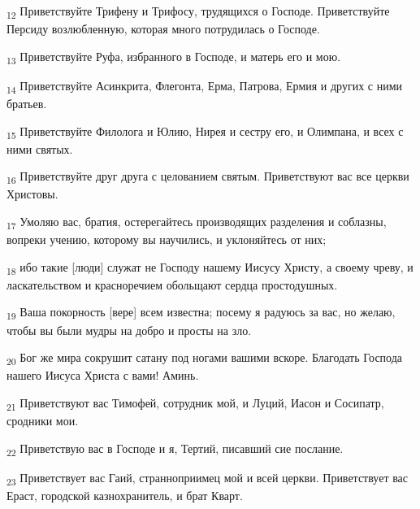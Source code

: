 \begin{tcolorbox}
\textsubscript{12} Приветствуйте Трифену и Трифосу, трудящихся о Господе. Приветствуйте Персиду возлюбленную, которая много потрудилась о Господе.
\end{tcolorbox}
\begin{tcolorbox}
\textsubscript{13} Приветствуйте Руфа, избранного в Господе, и матерь его и мою.
\end{tcolorbox}
\begin{tcolorbox}
\textsubscript{14} Приветствуйте Асинкрита, Флегонта, Ерма, Патрова, Ермия и других с ними братьев.
\end{tcolorbox}
\begin{tcolorbox}
\textsubscript{15} Приветствуйте Филолога и Юлию, Нирея и сестру его, и Олимпана, и всех с ними святых.
\end{tcolorbox}
\begin{tcolorbox}
\textsubscript{16} Приветствуйте друг друга с целованием святым. Приветствуют вас все церкви Христовы.
\end{tcolorbox}
\begin{tcolorbox}
\textsubscript{17} Умоляю вас, братия, остерегайтесь производящих разделения и соблазны, вопреки учению, которому вы научились, и уклоняйтесь от них;
\end{tcolorbox}
\begin{tcolorbox}
\textsubscript{18} ибо такие [люди] служат не Господу нашему Иисусу Христу, а своему чреву, и ласкательством и красноречием обольщают сердца простодушных.
\end{tcolorbox}
\begin{tcolorbox}
\textsubscript{19} Ваша покорность [вере] всем известна; посему я радуюсь за вас, но желаю, чтобы вы были мудры на добро и просты на зло.
\end{tcolorbox}
\begin{tcolorbox}
\textsubscript{20} Бог же мира сокрушит сатану под ногами вашими вскоре. Благодать Господа нашего Иисуса Христа с вами! Аминь.
\end{tcolorbox}
\begin{tcolorbox}
\textsubscript{21} Приветствуют вас Тимофей, сотрудник мой, и Луций, Иасон и Сосипатр, сродники мои.
\end{tcolorbox}
\begin{tcolorbox}
\textsubscript{22} Приветствую вас в Господе и я, Тертий, писавший сие послание.
\end{tcolorbox}
\begin{tcolorbox}
\textsubscript{23} Приветствует вас Гаий, странноприимец мой и всей церкви. Приветствует вас Ераст, городской казнохранитель, и брат Кварт.
\end{tcolorbox}
